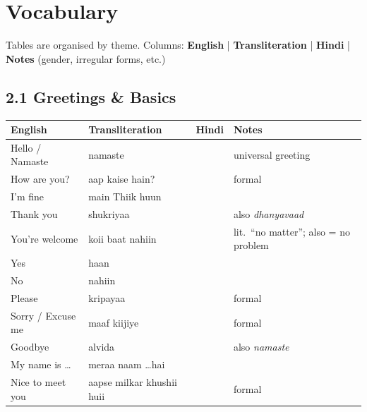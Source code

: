 \section{Vocabulary}

Tables are organised by theme. Columns: \textbf{English} | \textbf{Transliteration} | \textbf{Hindi} | \textbf{Notes} (gender, irregular forms, etc.)


\subsection{2.1 Greetings \& Basics}

\begin{tabular}{@{}VTDN@{}}
  \toprule
  English & Transliteration & Hindi & Notes \\
  \midrule
  Hello / Namaste      & namaste         &           & universal greeting \\
  How are you?         & aap kaise hain? &    & formal \\
  I'm fine             & main Thiik huun &   & \\
  Thank you            & shukriyaa       &         & also \textit{dhanyavaad} \\
  You're welcome       & koii baat nahiin &    & lit.\ ``no matter''; also = no problem \\
  Yes                  & haan           &              & \\
  No                   & nahiin          &             & \\
  Please               & kripayaa        &            & formal \\
  Sorry / Excuse me    & maaf kiijiye   &      & formal \\
  Goodbye              & alvida          &           & also \textit{namaste} \\
  My name is \ldots    & meraa naam \ldots hai &  & \\
  Nice to meet you     & aapse milkar khushii huii &  & formal \\
  \bottomrule
\end{tabular}

